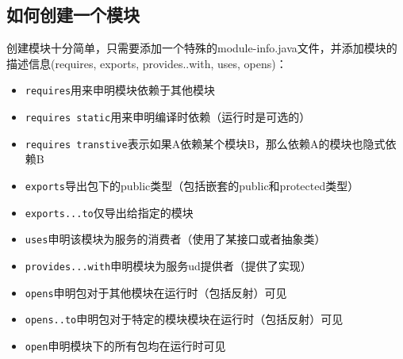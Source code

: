 \documentclass[12pt]{article}
\begin{document}
\subsection{如何创建一个模块}\label{ux5982ux4f55ux521bux5efaux4e00ux4e2aux6a21ux5757}

创建模块十分简单，只需要添加一个特殊的module-info.java文件，并添加模块的描述信息(requires, exports, provides..with, uses, opens)：

\begin{Shaded}
\begin{Highlighting}[]
\OperatorTok{\{}
\OperatorTok{;}
\OperatorTok{\}}
\end{Highlighting}
\end{Shaded}

\begin{itemize}
\tightlist
\item
  \texttt{requires}用来申明模块依赖于其他模块
\item
  \texttt{requires\ static}用来申明编译时依赖（运行时是可选的）
\item
  \texttt{requires\ transtive}表示如果A依赖某个模块B，那么依赖A的模块也隐式依赖B
\item
  \texttt{exports}导出包下的public类型（包括嵌套的public和protected类型）
\item
  \texttt{exports...to}仅导出给指定的模块
\item
  \texttt{uses}申明该模块为服务的消费者（使用了某接口或者抽象类）
\item
  \texttt{provides...with}申明模块为服务ud提供者（提供了实现）
\item
  \texttt{opens}申明包对于其他模块在运行时（包括反射）可见
\item
  \texttt{opens..to}申明包对于特定的模块模块在运行时（包括反射）可见
\item
  \texttt{open}申明模块下的所有包均在运行时可见
\end{itemize}

\begin{Shaded}
\begin{Highlighting}[]
 \OperatorTok{\{}
\OperatorTok{;}
\OperatorTok{\}}

 \OperatorTok{\{}
\OperatorTok{;}
\OperatorTok{\}}
\end{Highlighting}
\end{Shaded}
\end{document}
